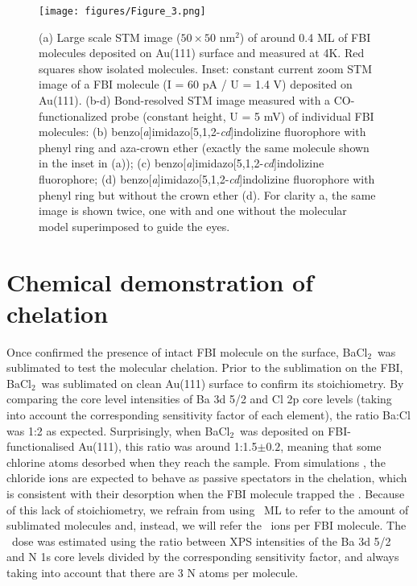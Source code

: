 \documentclass[aps,prl,reprint,longbibliography,superscriptaddress, english]{revtex4-1}
\def\BappCl{BaCl$_2$}
\begin{document}
\begin{figure}[ht!]
	\texttt{[image: figures/Figure\_3.png]}
	\caption{\label{FIG_BRSTM} 
    (a) Large scale STM image ($50\times50$ nm$^2$) of around 0.4 ML of FBI molecules deposited on Au(111) surface and measured at 4K. Red squares show isolated molecules. Inset: constant current zoom STM image of a FBI molecule (I = 60 pA / U = 1.4 V) deposited on Au(111). (b-d) Bond-resolved STM image measured with a CO-functionalized probe (constant height, U = 5 mV) of individual FBI molecules: (b) benzo[\textit{a}]imidazo[5,1,2-\textit{cd}]indolizine fluorophore with phenyl ring and aza-crown ether (exactly the same molecule shown in the inset in (a)); (c)  benzo[\textit{a}]imidazo[5,1,2-\textit{cd}]indolizine fluorophore; (d) benzo[\textit{a}]imidazo[5,1,2-\textit{cd}]indolizine fluorophore with phenyl ring but without the crown ether (d). For clarity a, the same image is shown twice, one with and one without the molecular model superimposed to guide the eyes.}
\end{figure}

\section{Chemical demonstration of chelation}

Once confirmed the presence of intact FBI molecule on the surface, \BappCl\ was sublimated to test the molecular chelation. Prior to the sublimation on the FBI, \BappCl\ was sublimated on clean Au(111) surface to confirm its stoichiometry. By comparing the core level intensities of Ba 3d 5/2 and Cl 2p core levels (taking into account the corresponding sensitivity factor of each element), the ratio Ba:Cl was 1:2 as expected. Surprisingly, when \BappCl\ was deposited on FBI-functionalised Au(111), this ratio was around 1:1.5$\pm{0.2}$, meaning that some chlorine atoms desorbed when they reach the sample. From simulations \cite{rivilla_fluorescent_2020}, the chloride ions are expected to behave as passive spectators in the chelation, which is consistent with their desorption when the FBI molecule trapped the \Bapp. Because of this lack of stoichiometry, we refrain from using \Bapp\ ML to refer to the amount of sublimated molecules and, instead, we will refer the \Bapp\ ions per FBI molecule. The \Bapp\ dose was estimated using the ratio between XPS intensities of the Ba 3d 5/2 and N 1s core levels divided by the corresponding sensitivity factor, and always taking into account that there are 3 N atoms per molecule.
\end{document}
